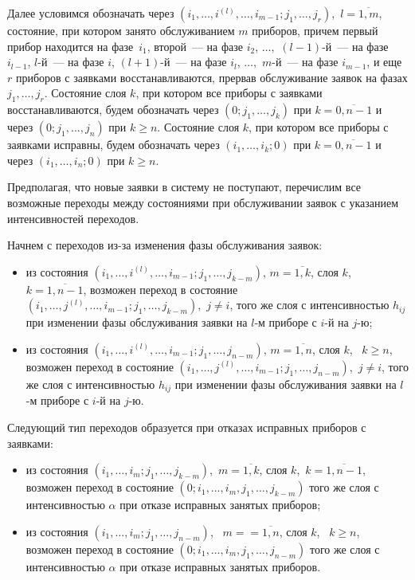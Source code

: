 \begin{multicols}{2}
Далее условимся обозначать через
$(i_1,\ldots,i^{(l)},\ldots,i_{m-1}; j_1,\ldots,j_{r})$,\
$l=\overline{1,m}$,
состояние, при котором занято обслуживанием $m$ приборов,
причем
первый прибор находится на фазе~$i_1$,
второй~--- на фазе $i_2$,
$\ldots,$
$(l-1)$-й~--- на фазе~$i_{l-1}$,
$l$-й~--- на фазе $i$,
$(l+1)$-й~--- на фазе $i_{l}$,
$\ldots,$
$m$-й~--- на фазе $i_{m-1}$,
и еще $r$ приборов с заявками восстанавливаются, прервав обслуживание
заявок на фазах $j_1,\ldots,j_{r}$.
Состояние слоя $k$, при котором все приборы с заявками восстанавливаются,
будем обозначать через $(0;j_1,\ldots,j_{k})$ при $k=\overline{0,n-1}$
и через $(0;j_1,\ldots,j_{n})$ при $k\ge n$.
Состояние слоя $k$, при котором все приборы с заявками исправны,
будем обозначать через $(i_1,\ldots,i_{k};0)$ при $k=\overline{0,n-1}$
и через $(i_1,\ldots,i_{n};0)$ при $k\ge n$.

Предполагая, что новые заявки в систему не поступают, перечислим все
возможные переходы между состояниями при обслуживании заявок с
указанием интенсивностей переходов.

Начнем с переходов из-за изменения фазы обслуживания заявок:
\begin{itemize}
\item
из состояния
$(i_1,\ldots,i^{(l)}\!,\ldots,i_{m-1};j_1,\ldots,j_{k-m})$, %
$m=\overline{1,k}$,
слоя $k$, \ $k=\overline{1,n-1}$, возможен переход в состояние
$(i_1,\ldots,j^{(l)},\ldots,i_{m-1};j_1,\ldots,j_{k-m})$,\  $j\ne i$,
того же слоя с интенсивностью $h_{ij}$ при изменении фазы обслуживания
заявки на $l$-м приборе с $i$-й на $j$-ю;
\item
из состояния
$(i_1,\ldots,i^{(l)}\!,\ldots,i_{m-1};j_1,\ldots,j_{n-m})$, %
$m=\overline{1,n}$,
слоя $k$, \ $k\ge n$, возможен переход в состояние
$(i_1,\ldots,j^{(l)},\ldots,i_{m-1};j_1,\ldots,j_{n-m})$,\  $j\ne i$,
того же слоя с интенсивностью $h_{ij}$ при изменении фазы обслуживания
заявки на $l$-м приборе с $i$-й на $j$-ю.
\end{itemize}

Следующий тип переходов образуется при отказах исправных
приборов с заявками:
\begin{itemize}
\item
из состояния
$(i_1,\ldots,i_{m};j_1,\ldots,j_{k-m})$,\  $m=\overline{1,k}$,
слоя $k$,\ $k=\overline{1,n-1}$, возможен переход в состояние
$(0;i_1,\ldots,i_{m},j_1,\ldots,j_{k-m})$ того же слоя с
интенсивностью $\alpha$ при отказе исправных занятых приборов;
\item
из состояния
$(i_1,\ldots,i_{m};j_1,\ldots,j_{n-m})$, \ $m=$\linebreak $=\overline{1,n}$,
слоя $k$, \ $k\ge n$, возможен переход в состояние
$(0;i_1,\ldots,i_{m},j_1,\ldots,j_{n-m})$ того же слоя с
интенсивностью $\alpha$ при отказе исправных занятых приборов.
\end{itemize}


\end{multicols}
